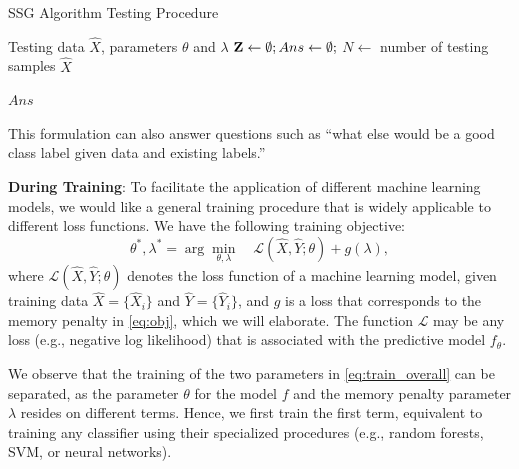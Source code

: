 \documentclass[letterpaper]{article}
\begin{document}
\begin{algorithm}[tb]
   \caption{SSG Algorithm Testing Procedure}
   \label{alg:test}
\begin{algorithmic}
    Testing data $\hat{X}$, parameters $\theta$ and $\lambda$
   \STATE ${\bf Z} \leftarrow \emptyset; Ans \leftarrow \emptyset;$
   \STATE $N \leftarrow$ number of testing samples $\hat{X}$

   \ENDWHILE
   \ENDFOR
	  {$Ans$}
\end{algorithmic}
\end{algorithm}



This formulation can also answer questions such as ``what else would be a good class label given data and existing labels.''

\textbf{During Training}: To facilitate the application of different machine learning models, we  would like a general training procedure that is widely applicable to different loss functions. We have the following training objective:
\begin{equation}
\label{eq:train_overall}
\theta^*, \lambda^* = \arg\min_{\theta,\lambda}  \quad \mathcal{L}(\hat{X},\hat{Y};\theta) + g(\lambda),
\end{equation}
where $\mathcal{L}(\hat{X},\hat{Y}; \theta)$ denotes the loss function of a machine learning model, given training data $\hat{X}=\{\hat{X}_i\}$ and $\hat{Y}=\{\hat{Y}_i\}$, and $g$ is a loss that corresponds to the memory penalty in \eqref{eq:obj}, which we will elaborate. The function $\mathcal{L}$ may be any loss (e.g., negative log likelihood) that is associated with the predictive model $f_{\theta}$.

We observe that the training of the two parameters in \eqref{eq:train_overall} can be separated, as the parameter $\theta$ for the model $f$ and the memory penalty parameter $\lambda$ resides on different terms. Hence, we first train the first term, equivalent to training any classifier using their specialized procedures (e.g., random forests, SVM, or neural networks).
\end{document}

